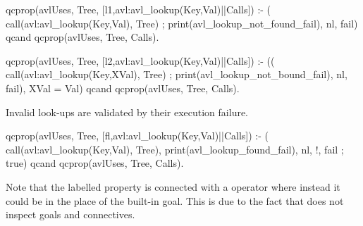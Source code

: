 \begin{yapcode}
 qcprop({avlUses, Tree,
      [{l1,avl:avl_lookup(Key,Val)}||Calls]}) :-
   ( call(avl:avl_lookup(Key,Val), Tree)
   ; print(avl_lookup_not_found_fail),
     nl, fail)
     qcand
   qcprop({avlUses, Tree, Calls}).
\end{yapcode}
\begin{yapcode}
 qcprop({avlUses, Tree,
      [{l2,avl:avl_lookup(Key,Val)}||Calls]}) :-
   (( call(avl:avl_lookup(Key,XVal), Tree)
    ; print(avl_lookup_not_bound_fail),
     nl, fail),
    XVal = Val)
     qcand
   qcprop({avlUses, Tree, Calls}).
\end{yapcode}
%
Invalid look-ups are validated by their execution failure.
\begin{yapcode}
 qcprop({avlUses, Tree,
      [{fl,avl:avl_lookup(Key,Val)}||Calls]}) :-
   ( call(avl:avl_lookup(Key,Val), Tree),
     print(avl_lookup_found_fail), nl, !, fail
   ; true)
     qcand
   qcprop({avlUses, Tree, Calls}).
\end{yapcode}
%
Note that the labelled property is connected with a  operator
where instead it could be in the place of the  \Prolog{}
built-in goal.
%
This is due to the fact that \plqc{} does not inspect \Prolog{} goals
and connectives.


